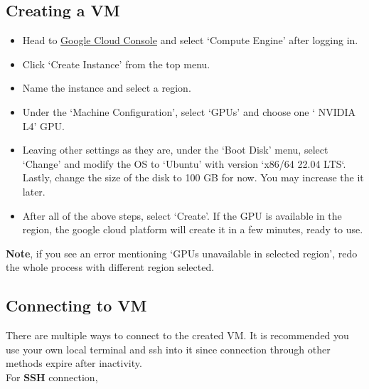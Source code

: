 \documentclass[12pt]{article}
\begin{document}
\subsection{Creating a VM}

\begin{itemize}
	\item
	Head to \href{https://console.cloud.google.com/}{\color{blue}Google Cloud Console} and select `Compute Engine' after logging in. 
	
	\item
	Click `Create Instance' from the top menu.
	
	\item
	Name the instance and select a region.
	
	\item
	Under the `Machine Configuration', select `GPUs' and choose one ` NVIDIA L4' GPU.
		
	\item
	Leaving other settings as they are, under the `Boot Disk' menu, select `Change' and modify the OS to `Ubuntu' with version `x86/64 22.04 LTS`. Lastly, change the size of the disk to 100 GB for now. You may increase the it later.
	
	\item
	After all of the above steps, select `Create'. If the GPU is available in the region, the google cloud platform will create it in a few minutes, ready to use.
\end{itemize}

\textbf{Note}, if you see an error mentioning `GPUs unavailable in selected region', redo the whole process with different region selected. 


\subsection{Connecting to VM}
There are multiple ways to connect to the created VM. It is recommended you use your own local terminal and ssh into it since connection through other methods expire after inactivity. \\

For \textbf{SSH} connection,
\end{document}
